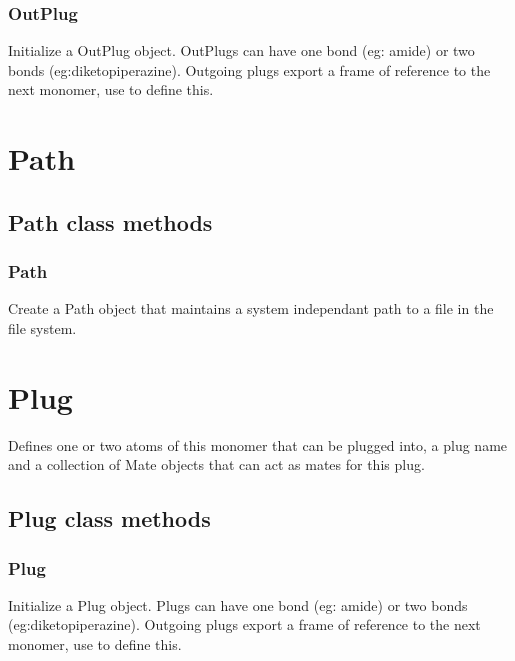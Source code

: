 \begin{itemize}
\subsubsection{OutPlug}

Initialize a OutPlug object. OutPlugs can have one bond (eg: amide) or two bonds (eg:diketopiperazine).
Outgoing plugs export a frame of reference to the next monomer, use  to define this.

\section{Path}
\subsection{Path class methods}
\subsubsection{Path}

Create a Path object that maintains a system independant path to a file in the file system.

\section{Plug}
Defines one or two atoms of this monomer that can be plugged into, a plug name and a
collection of Mate objects that can act as mates for this plug.

\subsection{Plug class methods}
\subsubsection{Plug}

Initialize a Plug object. Plugs can have one bond (eg: amide) or two bonds (eg:diketopiperazine).
Outgoing plugs export a frame of reference to the next monomer, use  to define this.


\end{itemize}
